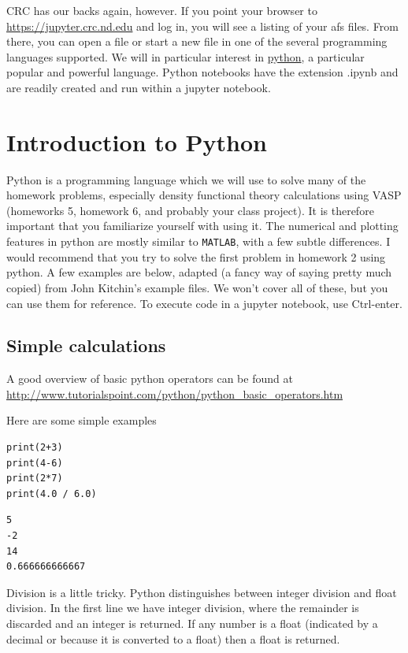 \documentclass[11pt]{article}
\begin{document}
CRC has our backs again, however.  If you point your browser to \url{https://jupyter.crc.nd.edu}
and log in, you will see a listing of your afs files.  From there, you can open a file or
start a new file in one of the several programming languages supported.  We will in
particular interest in \href{https://python.org}{python}, a particular popular and powerful language.  Python
notebooks have the extension .ipynb and are readily created and run within a jupyter notebook.

\section{Introduction to Python}
\label{sec:org94d1a80}
Python is a programming language which we will use to solve many of the homework problems,
especially density functional theory calculations using VASP (homeworks 5, homework 6, and
probably your class project). It is therefore important that you familiarize yourself with
using it. The numerical and plotting features in python are mostly similar to \texttt{MATLAB},
with a few subtle differences. I would recommend that you try to solve the first problem
in homework 2 using python. A few examples are below, adapted (a fancy way of saying
pretty much copied) from John Kitchin's example files. We won't cover all of these, but
you can use them for reference. To execute code in a jupyter notebook, use Ctrl-enter.

\subsection{Simple calculations}
\label{sec:org4330d06}

A good overview of basic python operators can be found at \url{http://www.tutorialspoint.com/python/python\_basic\_operators.htm}

Here are some simple examples
\begin{verbatim}
print(2+3)
print(4-6)
print(2*7)
print(4.0 / 6.0)
\end{verbatim}

\begin{verbatim}
5
-2
14
0.666666666667
\end{verbatim}


Division is a little tricky. Python distinguishes between integer division and float division. In the first line we have integer division, where the remainder is discarded and an integer is returned. If any number is a float (indicated by a decimal or because it is converted to a float) then a float is returned.
\end{document}
